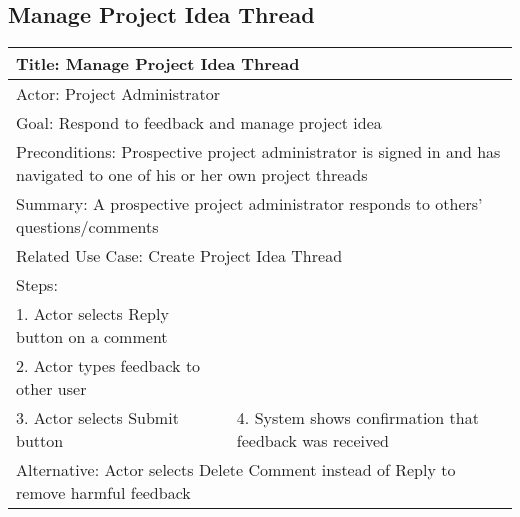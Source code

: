 \documentclass[10pt,a4paper]{article}
\begin{document}
\subsection{Manage Project Idea Thread	}
\begin{tabular}{|p{6cm}|p{6cm}|} \hline
\multicolumn{2}{|p{12cm}|}{Title: Manage Project Idea Thread	}                                                                                       \\ \hline
\multicolumn{2}{|p{12cm}|}{Actor: Project Administrator}                                                                                                       \\ \hline
\multicolumn{2}{|p{12cm}|}{Goal: Respond to feedback and manage project idea	} \\ \hline
\multicolumn{2}{|p{12cm}|}{Preconditions: Prospective project administrator is signed in and has navigated to one of his or her own project threads}                                                                                               \\ \hline
\multicolumn{2}{|p{12cm}|}{Summary: A prospective project administrator responds to others' questions/comments}                           \\ \hline
\multicolumn{2}{|p{12cm}|}{Related Use Case: Create Project Idea Thread	}                               \\ \hline
Steps:                                                                              &                                                 \\ \hline
1. Actor selects Reply button on a comment &                                                 \\ \hline
2. Actor types feedback to other user &                                                 \\ \hline
3. Actor selects Submit button&     
4. System shows confirmation that feedback was received                                             \\ \hline
\multicolumn{2}{|p{12cm}|}{Alternative: Actor selects Delete Comment instead of Reply to remove harmful feedback	} \\ \hline
\end{tabular}
\end{document}
